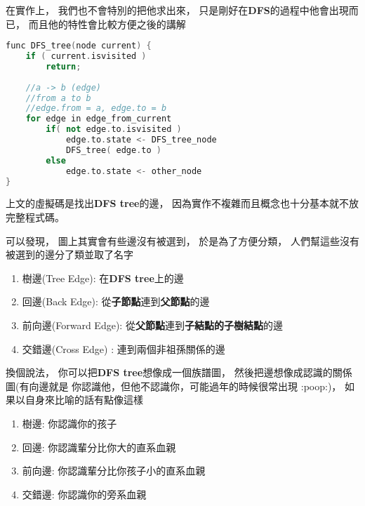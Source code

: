 \documentclass[12pt,oneside]{article}
\begin{document}
在實作上，
我們也不會特別的把他求出來，
只是剛好在\textbf{DFS}的過程中他會出現而已，
而且他的特性會比較方便之後的講解
\vspace*{3em}
\begin{lstlisting}[language=C++,escapeinside=``]
func DFS_tree(node current) {
    if ( current.isvisited ) 
        return;
    
    //a -> b (edge)
    //from a to b
    //edge.from = a, edge.to = b
    for edge in edge_from_current 
        if( not edge.to.isvisited )
            edge.to.state <- DFS_tree_node
            DFS_tree( edge.to )
        else   
            edge.to.state <- other_node
}
\end{lstlisting}
\vspace*{3em}

上文的虛擬碼是找出\textbf{DFS tree}的邊，
因為實作不複雜而且概念也十分基本就不放完整程式碼。

可以發現，
圖上其實會有些邊沒有被選到，
於是為了方便分類，
人們幫這些沒有被選到的邊分了類並取了名字

\begin{enumerate}
    \item 
        樹邊(Tree Edge): 在\textbf{DFS tree}上的邊
    \item 
        回邊(Back Edge): 從\textbf{子節點}連到\textbf{父節點}的邊
    \item 
        前向邊(Forward Edge): 從\textbf{父節點}連到\textbf{子結點的子樹結點}的邊
    \item 
        {\color{blue}交錯邊}(Cross Edge) : 連到兩個非祖孫關係的邊
\end{enumerate}

換個說法，
你可以把\textbf{DFS tree}想像成一個族譜圖，
然後把邊想像成認識的關係圖(有向邊就是 你認識他，但他不認識你，可能過年的時候很常出現 :poop:)，
如果以自身來比喻的話有點像這樣

\begin{enumerate}
    \item 樹邊: 你認識你的孩子
    \item 回邊: 你認識輩分比你大的直系血親
    \item 前向邊: 你認識輩分比你孩子小的直系血親 
    \item 交錯邊: 你認識你的旁系血親
\end{enumerate}
\end{document}
